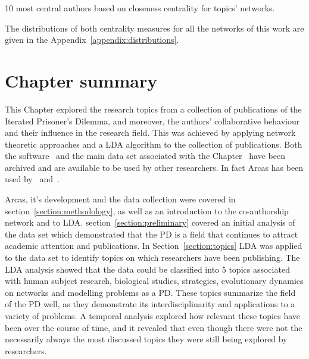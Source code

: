 \begin{table}[!hbtp]
    \begin{center}
    \resizebox{.9\textwidth}{!}{}
\end{center}
\caption{10 most central authors based on closeness centrality
for topics' networks.}\label{table:central_authors_cc_topics}
\end{table}

The distributions of both centrality measures for all the networks of this
work are given in the Appendix~\ref{appendix:distributions}.

\section{Chapter summary}\label{section:conclusion}

This Chapter explored the research topics from a collection of \totalarticles publications of the
Iterated Prisoner's Dilemma, and moreover, the authors' collaborative behaviour
and their influence in the research field. This was achieved by
applying network theoretic approaches and a LDA algorithm to the collection of publications.
Both the software~\cite{nikoleta_2017} and the main data set associated with the Chapter~\cite{nikoleta_2017}
have been archived and are available to be used by other researchers. In
fact Arcas has been used by~\cite{brane} and~\cite{arcas_blog}.

Arcas, it's development and the data collection were covered in section~\ref{section:methodology},
as well as an introduction to the co-authorship network and to LDA.
section~\ref{section:preliminary} covered an initial analysis of the data set
which demonstrated that the PD is a field that continues to attract academic
attention and publications. In Section~\ref{section:topics} LDA was
applied to the data set to identify topics on which researchers have been
publishing. The LDA analysis showed that the data could be classified into 5
topics associated with human subject research, biological studies, strategies,
evolutionary dynamics on networks and modelling
problems as a PD. These topics summarize the field of the PD well, as they
demonstrate its interdisciplinarity and applications to a variety of problems. A
temporal analysis explored how relevant these topics have been over the course
of time, and it revealed that even though there were not the necessarily always
the most discussed topics they were still being explored by researchers.

